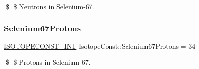 \$ \$ Neutrons in Selenium-\/67. \mbox{\label{group___isotope_const-_selenium-_se67_gaa217e7644893cf25fcdb9ff111bb7655}} 
\subsubsection{\texorpdfstring{Selenium67\+Protons}{Selenium67Protons}}
{\footnotesize\ttfamily \mbox{\hyperlink{group___isotope_const-_macros_ga5f18360b3e99483a35c32d789e62621c}{I\+S\+O\+T\+O\+P\+E\+C\+O\+N\+S\+T\+\_\+\+I\+NT}} Isotope\+Const\+::\+Selenium67\+Protons = 34}

\$ \$ Protons in Selenium-\/67. 